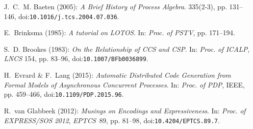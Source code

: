 \documentclass[]{eptcs}
\begin{document}
\begin{thebibliography}{10}
\providecommand{\bibitemdeclare}[2]{}
\providecommand{\surnamestart}{}
\providecommand{\surnameend}{}
\providecommand{\urlprefix}{Available at }
\providecommand{\url}[1]{\texttt{#1}}
\providecommand{\href}[2]{\texttt{#2}}
\providecommand{\urlalt}[2]{\href{#1}{#2}}
\providecommand{\doi}[1]{doi:\urlalt{http://dx.doi.org/#1}{#1}}
\providecommand{\bibinfo}[2]{#2}

\bibitemdeclare{article}{Baeten:2005:BHP:1085667.1085669}
\bibinfo{author}{J.~C.~M. \surnamestart Baeten\surnameend}
  (\bibinfo{year}{2005}): \emph{\bibinfo{title}{{A Brief History of Process
  Algebra}}}.
\newblock {\sl \bibinfo{journal}{Theor. Comput. Sci.}}
  \bibinfo{volume}{335}(\bibinfo{number}{2-3}), pp. \bibinfo{pages}{131--146},
  \doi{10.1016/j.tcs.2004.07.036}.

\bibitemdeclare{inproceedings}{DBLP:conf/pstv/Brinksma85}
\bibinfo{author}{E.~\surnamestart Brinksma\surnameend} (\bibinfo{year}{1985}):
  \emph{\bibinfo{title}{A tutorial on {LOTOS}}}.
\newblock In: {\sl \bibinfo{booktitle}{Proc. of PSTV}}, pp.
  \bibinfo{pages}{171--194}.

\bibitemdeclare{inproceedings}{DBLP:conf/icalp/Brookes83}
\bibinfo{author}{S.~D. \surnamestart Brookes\surnameend}
  (\bibinfo{year}{1983}): \emph{\bibinfo{title}{On the Relationship of {CCS}
  and {CSP}}}.
\newblock In: {\sl \bibinfo{booktitle}{Proc. of ICALP}}, {\sl
  \bibinfo{series}{LNCS}} \bibinfo{volume}{154}, pp. \bibinfo{pages}{83--96},
  \doi{10.1007/BFb0036899}.

\bibitemdeclare{inproceedings}{7092761}
\bibinfo{author}{H.~\surnamestart Evrard\surnameend} \&
  \bibinfo{author}{F.~\surnamestart Lang\surnameend} (\bibinfo{year}{2015}):
  \emph{\bibinfo{title}{Automatic Distributed Code Generation from Formal
  Models of Asynchronous Concurrent Processes}}.
\newblock In: {\sl \bibinfo{booktitle}{Proc. of PDP}},
  \bibinfo{publisher}{IEEE}, pp. \bibinfo{pages}{459--466},
  \doi{10.1109/PDP.2015.96}.

\bibitemdeclare{inproceedings}{DBLP:journals/corr/abs-1208-2750}
\bibinfo{author}{R.~\surnamestart van Glabbeek\surnameend}
  (\bibinfo{year}{2012}): \emph{\bibinfo{title}{{Musings on Encodings and
  Expressiveness}}}.
\newblock In: {\sl \bibinfo{booktitle}{Proc. of EXPRESS/SOS 2012}}, {\sl
  \bibinfo{series}{EPTCS}}~\bibinfo{volume}{89}, pp. \bibinfo{pages}{81--98},
  \doi{10.4204/EPTCS.89.7}.


\end{thebibliography}
\end{document}
